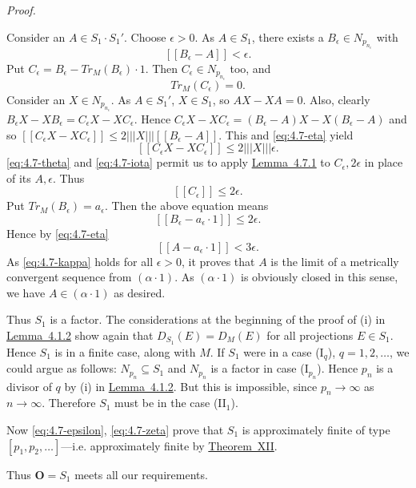 \documentclass[b5paper,twoside]{article}
\newcommand{\thmref}[2]{\hyperref[#1]{\mbox{Theorem~#2}}}
\newcommand{\lemref}[2]{\hyperref[#1]{\mbox{Lemma~#2}}}
\theoremstyle{mvnplain}
\renewenvironment{proof}[1][Proof]{%
  \par\addvspace{0.35\baselineskip}%
  \noindent\textit{#1.}\ \normalfont\ignorespaces
}{%
  \par\addvspace{0.35\baselineskip}%
}
\newcommand{\M}{\mathbf M}
\newcommand{\N}{\mathbf N}
\newcommand{\Metric}[1]{\left[\!\left[#1\right]\!\right]}
\newcommand{\OpNorm}[1]{\left\lvert\left\lvert\left\lvert#1\right\rvert\right\rvert\right\rvert}
\def\M{M}%
\def\N{N}%
\def\Metric#1{[[#1]]}%
\def\operatorname#1{#1}%
\begin{document}
\begin{proof}
Consider an \(A\in S_1\cdot S_1'\). Choose \(\epsilon>0\). As
\(A\in S_1\), there exists a \(B_\epsilon\in\N_{p_{n_\epsilon}}\) with
\begin{equation}\tag{4.7.\(\eta\)}\label{eq:4.7-eta}
 \Metric{B_\epsilon-A}<\epsilon.
\end{equation}
Put \(C_\epsilon=B_\epsilon-\operatorname{Tr}_{\M}(B_\epsilon)\cdot1\).
Then \(C_\epsilon\in\N_{p_{n_\epsilon}}\) too, and
\begin{equation}\tag{4.7.\(\theta\)}\label{eq:4.7-theta}
 \operatorname{Tr}_{\M}(C_\epsilon)=0.
\end{equation}
Consider an \(X\in\N_{p_{n_\epsilon}}\). As \(A\in S_1'\),
\(X\in S_1\), so \(AX-XA=0\). Also, clearly
\(B_\epsilon X-XB_\epsilon=C_\epsilon X-XC_\epsilon\). Hence
\(C_\epsilon X-XC_\epsilon=(B_\epsilon-A)X-X(B_\epsilon-A)\) and so
\(\Metric{C_\epsilon X-XC_\epsilon}\leq
2\OpNorm{X}\Metric{B_\epsilon-A}\). This and \eqref{eq:4.7-eta} yield
\begin{equation}\tag{4.7.\(\iota\)}\label{eq:4.7-iota}
 \Metric{C_\epsilon X-XC_\epsilon}\leq2\OpNorm{X}\epsilon.
\end{equation}
\eqref{eq:4.7-theta} and \eqref{eq:4.7-iota} permit us to apply
\lemref{lem:4.7.1}{4.7.1} to \(C_\epsilon,2\epsilon\) in place of its
\(A,\epsilon\). Thus
\[
 \Metric{C_\epsilon}\leq2\epsilon.
\]
Put \(\operatorname{Tr}_{\M}(B_\epsilon)=a_\epsilon\). Then the above
equation means
\[
 \Metric{B_\epsilon-a_\epsilon\cdot1}\leq2\epsilon.
\]
Hence by \eqref{eq:4.7-eta}
\begin{equation}\tag{4.7.\(\kappa\)}\label{eq:4.7-kappa}
 \Metric{A-a_\epsilon\cdot1}<3\epsilon.
\end{equation}
As \eqref{eq:4.7-kappa} holds for all \(\epsilon>0\), it proves that \(A\)
is the limit of a metrically convergent sequence from \((\alpha\cdot1)\).
As \((\alpha\cdot1)\) is obviously closed in this sense, we have
\(A\in(\alpha\cdot1)\) as desired.

Thus \(S_1\) is a factor. The considerations at the beginning of the proof of
(i) in \lemref{lem:4.1.2}{4.1.2} show again that
\(D_{S_1}(E)=D_{\M}(E)\) for all projections \(E\in S_1\). Hence \(S_1\)
is in a finite case, along with \(\M\). If \(S_1\) were in a case (I\(_q\)),
\(q=1,2,\ldots\), we could argue as follows: \(\N_{p_n}\subseteq S_1\) and
\(\N_{p_n}\) is a factor in case (I\(_{p_n}\)). Hence \(p_n\) is a divisor
of \(q\) by (i) in \lemref{lem:4.1.2}{4.1.2}. But this is impossible, since
\(p_n\to\infty\) as \(n\to\infty\). Therefore \(S_1\) must be in the case
(II\(_1\)).

Now \eqref{eq:4.7-epsilon}, \eqref{eq:4.7-zeta} prove that \(S_1\) is
approximately finite of type \([p_1,p_2,\ldots]\)---i.e. approximately finite
by \thmref{thm:XII}{XII}.

Thus \(\mathbf O=S_1\) meets all our requirements.
\end{proof}
\end{document}
